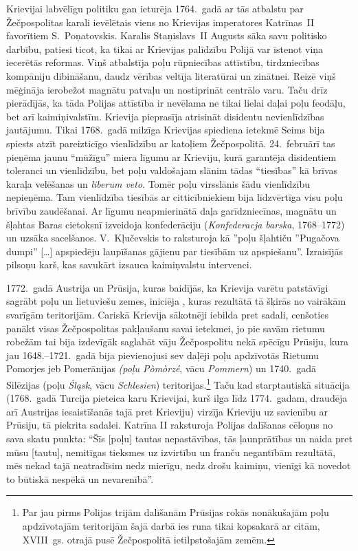 \documentclass[twoside,a5paper,12pt,fleqn,openany]{extbook}
\newcommand{\pltxti}[1]{\textit{\textpolish{#1}}}
\newcommand{\detxti}[1]{\textit{\textgerman{#1}}}
\newcommand{\latxti}[1]{\textit{\textlatin{#1}}}
\newcommand{\citespace}{[\dots{}]}
\begin{document}
Krievijai labvēlīgu politiku gan ieturēja 1764.~gadā ar tās atbalstu par Žečpospolitas karali ievēlētais viens no Krievijas imperatores Katrīnas~II favorītiem S.~Poņatovskis. Karalis Staņislavs~II Augusts sāka savu politisko darbību, patiesi ticot, ka tikai ar Krievijas palīdzību Polijā var īstenot viņa iecerētās reformas. Viņš atbalstīja poļu rūpniecības attīstību, tirdzniecības kompāniju dibināšanu, daudz vērības veltīja literatūrai un zinātnei. Reizē viņš mēģināja ierobežot magnātu patvaļu un nostiprināt centrālo varu. Taču drīz pierādījās, ka tāda Polijas attīstība ir nevēlama ne tikai lielai daļai poļu feodāļu, bet arī kaimiņivalstīm. Krievija pieprasīja atrisināt disidentu nevienlīdzības jautājumu. Tikai 1768.~gadā milzīga Krievijas spiediena ietekmē Seims bija spiests atzīt pareizticīgo vienlīdzību ar katoļiem Žečpospolitā. 24.~februārī tas pieņēma jaunu ``mūžīgu'' miera līgumu ar Krieviju, kurā garantēja disidentiem toleranci un vienlīdzību, bet poļu valdošajam slānim tādas ``tiesības'' kā brīvas karaļa velēšanas un \latxti{liberum veto}. Tomēr poļu virsslānis šādu vienlīdzību nepieņēma. Tam vienlīdzība tiesībās ar citticībniekiem bija līdzvērtīga visu poļu brīvību zaudēšanai. Ar līgumu neapmierinātā daļa garīdzniecīnas, magnātu un šļahtas Baras cietoksnī izveidoja konfederāciju (\pltxti{Konfederacja barska}, 1768--1772) un uzsāka sacelšanos. V.~Kļučevskis to raksturoja kā ''poļu šļahtiču ''Pugačova dumpi'' \citespace{} apspiedēju laupīšanas gājienu par tiesībām uz apspiešanu''. Izraisījās pilsoņu karš, kas savukārt izsauca kaimiņvalstu intervenci.

1772.~gadā Austrija un Prūsija, kuras baidījās, ka Krievija varētu patstāvīgi sagrābt poļu un lietuviešu zemes, iniciēja , kuras rezultātā tā šķirās no vairākām svarīgām teritorijām. Cariskā Krievija sākotnēji iebilda pret sadali, cenšoties panākt visas Žečpospolitas pakļaušanu savai ietekmei, jo pie savām rietumu robežām tai bija izdevīgāk saglabāt vāju Žečpospolitu nekā spēcīgu Prūsiju, kura jau 1648.--1721.~gadā bija pievienojusi sev daļēji poļu apdzīvotās Rietumu Pomorjes jeb Pomerānijas \pltxti{(poļu Pòmòrzé}, vācu \detxti{Pommern}) un 1740.~gadā Silēzijas (poļu \pltxti{Śląsk}, vācu \detxti{Schlesien}) teritorijas.\footnote{Par jau pirms Polijas trijām dalīšanām Prūsijas rokās nonākušajām poļu apdzīvotajām teritorijām šajā darbā ies runa tikai kopsakarā ar citām, XVIII~gs. otrajā pusē Žečpospolitā ietilpstošajām zemēm.} Taču kad starptautiskā situācija (1768.~gadā Turcija pieteica karu Krievijai, kurš ilga līdz 1774.~gadam, draudēja arī Austrijas iesaistīšanās tajā pret Krieviju) virzīja Krieviju uz savienību ar Prūsiju, tā piekrita sadalei. Katrīna II raksturoja Polijas dalīšanas cēloņus no sava skatu punkta: ``Šīs [poļu] tautas nepastāvības, tās ļaunprātības un naida pret mūsu [tautu], nemitīgas tieksmes uz izvirtību un franču negantībām rezultātā, mēs nekad tajā neatradīsim nedz mierīgu, nedz drošu kaimiņu, vienīgi kā novedot to būtiskā nespēkā un nevarenībā''.
\end{document}
